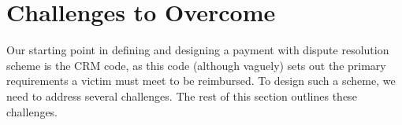 

\section{Challenges to Overcome}\label{sec:: challenges}


Our starting point in defining and designing a payment with dispute resolution scheme is the CRM code, as this code (although vaguely) sets out the primary requirements a victim must meet to be reimbursed.  To design such a scheme, we need to address several challenges. The rest of this section outlines these challenges. 










